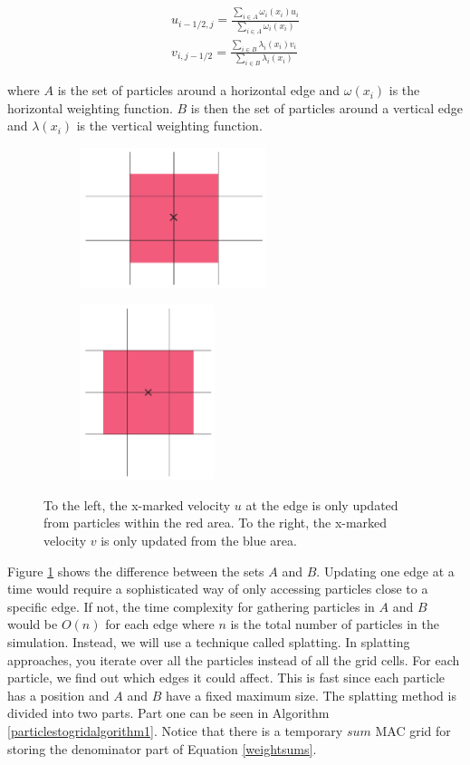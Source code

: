 \begin{eqnarray}
u_{i-1/2,j} = \frac{\sum\limits_{i\in A}\omega_i(x_i) u_{i}}{\sum\limits_{i \in A}\omega_i(x_i)} \\
v_{i,j-1/2} = \frac{ \sum\limits_{i \in B}\lambda_i(x_i) v_{i}}{\sum\limits_{i \in B}\lambda_i(x_i)}
\label{weightsums}
\end{eqnarray}

where $A$ is the set of particles around a horizontal edge and $\omega(x_i)$ is the horizontal weighting function. $B$ is then the set of particles around a vertical edge and $\lambda(x_i)$ is the vertical weighting function.
\begin{figure}[ht!]
\centering
\begin{subfigure}[b]{0.3\textwidth}
\includegraphics[height=41mm]{img/areau.pdf}
\end{subfigure}
\begin{subfigure}[b]{0.3\textwidth}
\includegraphics[height=51mm]{img/areav.pdf}
\end{subfigure}
\caption{To the left, the x-marked velocity $u$ at the edge is only updated from particles within the red area. To the right, the x-marked velocity $v$ is only updated from the blue area.}
\label{areaa}
\end{figure}
\newline
\newline
\noindent
Figure \ref{areaa} shows the difference between the sets $A$ and $B$. Updating one edge at a time would require a sophisticated way of only accessing particles close to a specific edge. If not, the time complexity for gathering particles in $A$ and $B$ would be $O(n)$ for each edge where $n$ is the total number of particles in the simulation. Instead, we will use a technique called splatting. In splatting approaches, you iterate over all the particles instead of all the grid cells. For each particle, we find out which edges it could affect. This is fast since each particle has a position and $A$ and $B$ have a fixed maximum size. The splatting method is divided into two parts. Part one can be seen in Algorithm \ref{particlestogridalgorithm1}. Notice that there is a temporary $sum$ MAC grid for storing the denominator part of Equation \ref{weightsums}.
